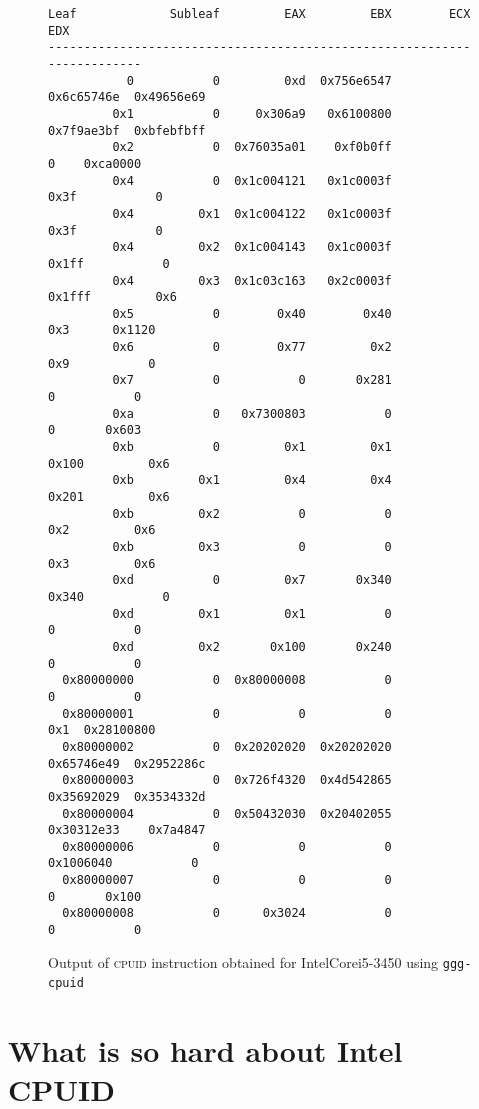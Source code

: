 \documentclass[a4paper,10pt,oneside,unicode]{article}
\newcommand{\cpuid}{\textsc{cpuid} }
\begin{document}
\begin{figure}[htbp]
\centering
\begin{verbatim}
Leaf             Subleaf         EAX         EBX        ECX          EDX
------------------------------------------------------------------------
           0           0         0xd  0x756e6547  0x6c65746e  0x49656e69
         0x1           0     0x306a9   0x6100800  0x7f9ae3bf  0xbfebfbff
         0x2           0  0x76035a01    0xf0b0ff           0    0xca0000
         0x4           0  0x1c004121   0x1c0003f        0x3f           0
         0x4         0x1  0x1c004122   0x1c0003f        0x3f           0
         0x4         0x2  0x1c004143   0x1c0003f       0x1ff           0
         0x4         0x3  0x1c03c163   0x2c0003f      0x1fff         0x6
         0x5           0        0x40        0x40         0x3      0x1120
         0x6           0        0x77         0x2         0x9           0
         0x7           0           0       0x281           0           0
         0xa           0   0x7300803           0           0       0x603
         0xb           0         0x1         0x1       0x100         0x6
         0xb         0x1         0x4         0x4       0x201         0x6
         0xb         0x2           0           0         0x2         0x6
         0xb         0x3           0           0         0x3         0x6
         0xd           0         0x7       0x340       0x340           0
         0xd         0x1         0x1           0           0           0
         0xd         0x2       0x100       0x240           0           0
  0x80000000           0  0x80000008           0           0           0
  0x80000001           0           0           0         0x1  0x28100800
  0x80000002           0  0x20202020  0x20202020  0x65746e49  0x2952286c
  0x80000003           0  0x726f4320  0x4d542865  0x35692029  0x3534332d
  0x80000004           0  0x50432030  0x20402055  0x30312e33    0x7a4847
  0x80000006           0           0           0   0x1006040           0
  0x80000007           0           0           0           0       0x100
  0x80000008           0      0x3024           0           0           0
\end{verbatim}

    \caption{Output of \cpuid instruction obtained for Intel\textregistered Core\texttrademark i5-3450 using \texttt{ggg-cpuid}~\cite{ggg-cpuid}}\label{fig:real-hw}
\end{figure}

\section{What is so hard about Intel CPUID}
\end{document}
